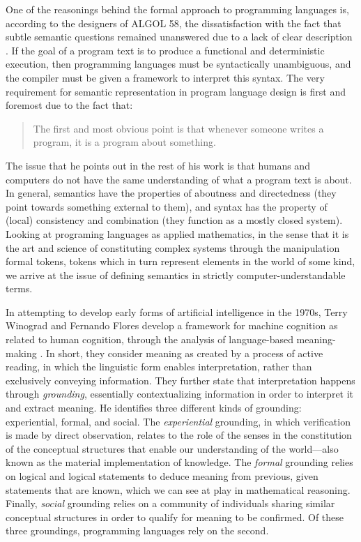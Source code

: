 One of the reasonings behind the formal approach to programming languages is, according to the designers of ALGOL 58, the dissatisfaction with the fact that subtle semantic questions remained unanswered due to a lack of clear description \citep{sethi_programming_1996}. If the goal of a program text is to produce a functional and deterministic execution, then programming languages must be syntactically unambiguous, and the compiler must be given a framework to interpret this syntax. The very requirement for semantic representation in program language design is first and foremost due to the fact that:

\begin{quote}
  The first and most obvious point is that whenever someone writes a program, it is a program about something. \citep{winograd_language_1982}
\end{quote}

The issue that he points out in the rest of his work is that humans and computers do not have the same understanding of what a program text is about. In general, semantics have the properties of aboutness and directedness (they point towards something external to them), and syntax has the property of (local) consistency and combination (they function as a mostly closed system). Looking at programing languages as applied mathematics, in the sense that it is the art and science of constituting complex systems through the manipulation formal tokens, tokens which in turn represent elements in the world of some kind, we arrive at the issue of defining semantics in strictly computer-understandable terms.

In attempting to develop early forms of artificial intelligence in the 1970s, Terry Winograd and Fernando Flores develop a framework for machine cognition as related to human cognition, through the analysis of language-based meaning-making \citep{winograd_understanding_1986}. In short, they consider meaning as created by a process of active reading, in which the linguistic form enables interpretation, rather than exclusively conveying information. They further state that interpretation happens through \emph{grounding}, essentially contextualizing information in order to interpret it and extract meaning. He identifies three different kinds of grounding: experiential, formal, and social. The \emph{experiential} grounding, in which verification is made by direct observation, relates to the role of the senses in the constitution of the conceptual structures that enable our understanding of the world—also known as the material implementation of knowledge. The \emph{formal} grounding relies on logical and logical statements to deduce meaning from previous, given statements that are known, which we can see at play in mathematical reasoning. Finally, \emph{social} grounding relies on a community of individuals sharing similar conceptual structures in order to qualify for meaning to be confirmed. Of these three groundings, programming languages rely on the second.


